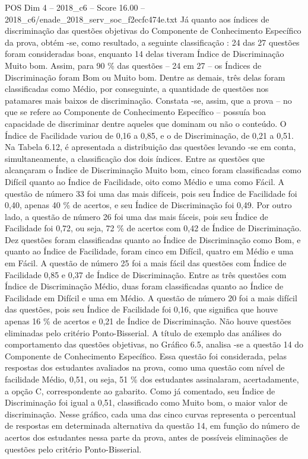 \begin{textsample}{POS Dim 4 – 2018\_c6 – Score 16.00 – 2018\_c6/enade\_2018\_serv\_soc\_f2ecfc474e.txt}
Já quanto aos índices de discriminação das questões objetivas do Componente de Conhecimento Específico da prova, obtém -se, como resultado, a seguinte classificação : 24 das 27 questões foram consideradas boas, enquanto 14 delas tiveram Índice de Discriminação Muito bom.
Assim, para 90 \% das questões – 24 em 27 – os Índices de Discriminação foram Bom ou Muito bom.
Dentre as demais, três delas foram classificadas como Médio, por conseguinte, a quantidade de questões nos patamares mais baixos de discriminação.
Constata -se, assim, que a prova – no que se refere ao Componente de Conhecimento Específico – possuía boa capacidade de discriminar dentre aqueles que dominam ou não o conteúdo.
O Índice de Facilidade variou de 0,16 a 0,85, e o de Discriminação, de 0,21 a 0,51.
Na Tabela 6.12, é apresentada a distribuição das questões levando -se em conta, simultaneamente, a classificação dos dois índices.
Entre as questões que alcançaram o Índice de Discriminação Muito bom, cinco foram classificadas como Difícil quanto ao Índice de Facilidade, oito como Médio e uma como Fácil.
A questão de número 33 foi uma das mais difíceis, pois seu Índice de Facilidade foi 0,40, apenas 40 \% de acertos, e seu Índice de Discriminação foi 0,49.
Por outro lado, a questão de número 26 foi uma das mais fáceis, pois seu Índice de Facilidade foi 0,72, ou seja, 72 \% de acertos com 0,42 de Índice de Discriminação.
Dez questões foram classificadas quanto ao Índice de Discriminação como Bom, e quanto ao Índice de Facilidade, foram cinco em Difícil, quatro em Médio e uma em Fácil.
A questão de número 25 foi a mais fácil das questões com Índice de Facilidade 0,85 e 0,37 de Índice de Discriminação.
Entre as três questões com Índice de Discriminação Médio, duas foram classificadas quanto ao Índice de Facilidade em Difícil e uma em Médio.
A questão de número 20 foi a mais difícil das questões, pois seu Índice de Facilidade foi 0,16, que significa que houve apenas 16 \% de acertos e 0,21 de Índice de Discriminação.
Não houve questões eliminadas pelo critério Ponto-Bisserial.
A título de exemplo das análises do comportamento das questões objetivas, no Gráfico 6.5, analisa -se a questão 14 do Componente de Conhecimento Específico.
Essa questão foi considerada, pelas respostas dos estudantes avaliados na prova, como uma questão com nível de facilidade Médio, 0,51, ou seja, 51 \% dos estudantes assinalaram, acertadamente, a opção C, correspondente ao gabarito.
Como já comentado, seu Índice de Discriminação foi igual a 0,51, classificado como Muito bom, o maior valor de discriminação.
Nesse gráfico, cada uma das cinco curvas representa o percentual de respostas em determinada alternativa da questão 14, em função do número de acertos dos estudantes nessa parte da prova, antes de possíveis eliminações de questões pelo critério Ponto-Bisserial.

\end{textsample}
